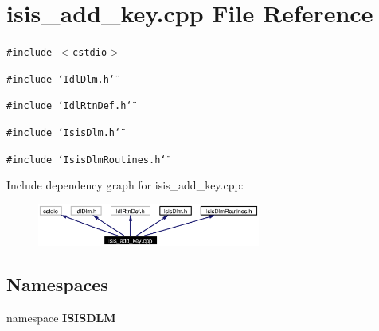 \section{isis\_\-add\_\-key.cpp File Reference}
\label{isis__add__key_8cpp}
{\tt \#include $<$cstdio$>$}\par
{\tt \#include \char`\"{}Idl\-Dlm.h\char`\"{}}\par
{\tt \#include \char`\"{}Idl\-Rtn\-Def.h\char`\"{}}\par
{\tt \#include \char`\"{}Isis\-Dlm.h\char`\"{}}\par
{\tt \#include \char`\"{}Isis\-Dlm\-Routines.h\char`\"{}}\par


Include dependency graph for isis\_\-add\_\-key.cpp:\begin{figure}[H]
\begin{center}
\leavevmode
\includegraphics[width=208pt]{isis__add__key_8cpp__incl}
\end{center}
\end{figure}
\subsection*{Namespaces}
\begin{CompactItemize}
\item 
namespace {\bf ISISDLM}
\end{CompactItemize}
